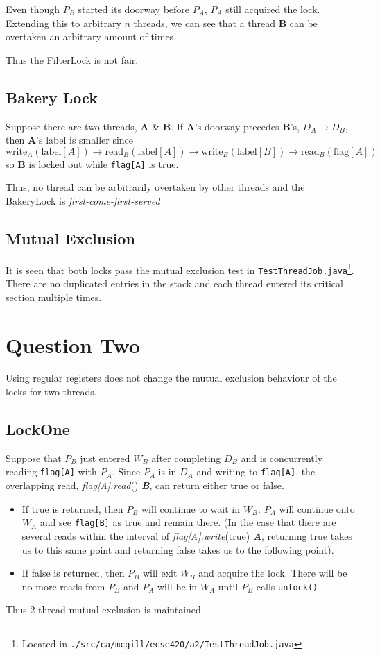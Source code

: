 \documentclass[12pt,letterpaper,titlepage]{article}
\newcommand{\methodcall}[4]{\textlangle{}\emph{#1.#2}(#3) \emph{\textbf{#4}}\textrangle{}}
\begin{document}
    Even though $P_B$ started its doorway before $P_A$, $P_A$ still acquired the lock. Extending this to arbitrary $n$ threads, we can see that a thread \textbf{B} can be overtaken an arbitrary amount of times.
    
    Thus the FilterLock is not fair.
    
  \subsection{Bakery Lock}
    Suppose there are two threads, \textbf{A} \& \textbf{B}. If \textbf{A}'s doorway precedes \textbf{B}'s, $D_A \rightarrow D_B$, then \textbf{A}'s label is smaller since
    \begin{equation*}
      \text{write}_A(\text{label}[A])
      \rightarrow
      \text{read}_B(\text{label}[A])
      \rightarrow
      \text{write}_B(\text{label}[B])
      \rightarrow
      \text{read}_B(\text{flag}[A])
    \end{equation*}
    so \textbf{B} is locked out while \texttt{flag[A]} is true.
    
    Thus, no thread can be arbitrarily overtaken by other threads and the BakeryLock is \emph{first-come-first-served}
    
  \subsection{Mutual Exclusion} 
    It is seen that both locks pass the mutual exclusion test in \texttt{TestThreadJob.java}\footnote{Located in \texttt{./src/ca/mcgill/ecse420/a2/TestThreadJob.java}}. There are no duplicated entries in the stack and each thread entered its critical section multiple times.
  
  \section{Question Two}
    Using regular registers does not change the mutual exclusion behaviour of the locks for two threads.
    \subsection{LockOne}
    Suppose that $P_B$ just entered $W_B$ after completing $D_B$ and is concurrently reading \texttt{flag[A]} with $P_A$. Since $P_A$ is in $D_A$ and writing to \texttt{flag[A]}, the overlapping read, \methodcall{flag[A]}{read}{}{B}, can return either true or false.
    \begin{itemize}
      \item If true is returned, then $P_B$ will continue to wait in $W_B$. $P_A$ will continue onto $W_A$ and see \texttt{flag[B]} as true and remain there. (In the case that there are several reads within the interval of \methodcall{flag[A]}{write}{true}{A}, returning true takes us to this same point and returning false takes us to the following point).
      \item If false is returned, then $P_B$ will exit $W_B$ and acquire the lock. There will be no more reads from $P_B$ and $P_A$ will be in $W_A$ until $P_B$ calls \texttt{unlock()}
    \end{itemize}
    Thus 2-thread mutual exclusion is maintained.
    
\end{document}
